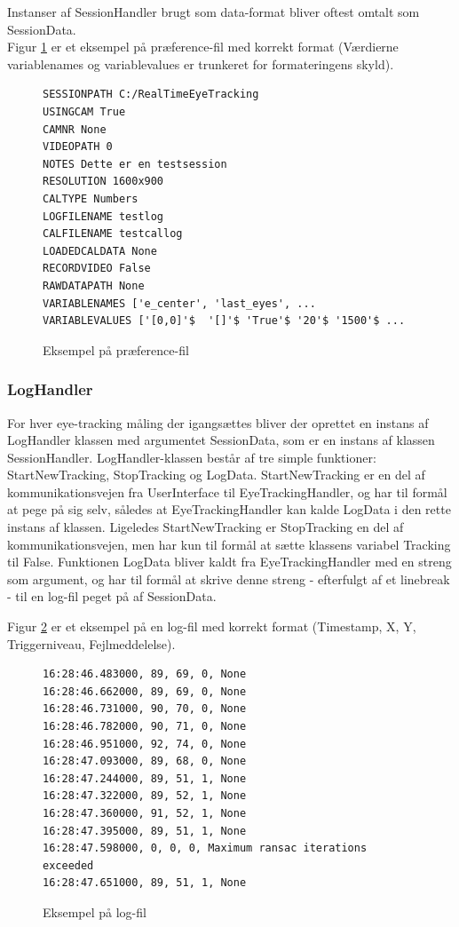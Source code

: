 \documentclass[rapport.tex]{subfiles}
\begin{document}
	Instanser af SessionHandler brugt som data-format bliver oftest omtalt som SessionData.\\
	
	Figur \ref{list:sessionfile} er et eksempel på præference-fil med korrekt format (Værdierne variablenames og variablevalues er trunkeret for formateringens skyld). 
\begin{figure}
\caption{Eksempel på præference-fil}
\label{list:sessionfile}
\begin{lstlisting}
SESSIONPATH C:/RealTimeEyeTracking
USINGCAM True
CAMNR None
VIDEOPATH 0
NOTES Dette er en testsession
RESOLUTION 1600x900
CALTYPE Numbers
LOGFILENAME testlog
CALFILENAME testcallog
LOADEDCALDATA None
RECORDVIDEO False
RAWDATAPATH None
VARIABLENAMES ['e_center', 'last_eyes', ...
VARIABLEVALUES ['[0,0]'$  '[]'$ 'True'$ '20'$ '1500'$ ...
\end{lstlisting}
\end{figure}
		
	\subsubsection{LogHandler}
	For hver eye-tracking måling der igangsættes bliver der oprettet en instans af LogHandler klassen med argumentet SessionData, som er en instans af klassen SessionHandler. LogHandler-klassen består af tre simple funktioner: StartNewTracking, StopTracking og LogData. StartNewTracking er en del af kommunikationsvejen fra UserInterface til EyeTrackingHandler, og har til formål at pege på sig selv, således at EyeTrackingHandler kan kalde LogData i den rette instans af klassen. 
	Ligeledes StartNewTracking er StopTracking en del af kommunikationsvejen, men har kun til formål at sætte klassens variabel Tracking til False. Funktionen LogData bliver kaldt fra EyeTrackingHandler med en streng som argument, og har til formål at skrive denne streng - efterfulgt af et linebreak - til en log-fil peget på af SessionData.  
	
	Figur \ref{list:logfile} er et eksempel på en log-fil med korrekt format (Timestamp, X, Y, Triggerniveau, Fejlmeddelelse). 
\begin{figure}
	\caption{Eksempel på log-fil}
	\label{list:logfile}
	\begin{lstlisting}	
16:28:46.483000, 89, 69, 0, None
16:28:46.662000, 89, 69, 0, None
16:28:46.731000, 90, 70, 0, None
16:28:46.782000, 90, 71, 0, None
16:28:46.951000, 92, 74, 0, None
16:28:47.093000, 89, 68, 0, None
16:28:47.244000, 89, 51, 1, None
16:28:47.322000, 89, 52, 1, None
16:28:47.360000, 91, 52, 1, None
16:28:47.395000, 89, 51, 1, None
16:28:47.598000, 0, 0, 0, Maximum ransac iterations exceeded
16:28:47.651000, 89, 51, 1, None
\end{lstlisting}
\end{figure}	
	
\end{document}
